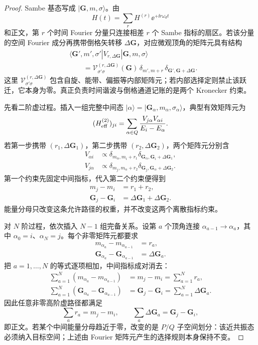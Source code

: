 \begin{proof}
Sambe 基态写成 $|\mathbf G,m,\sigma\rangle$。由
\[
H(t)=\sum_r H^{(r)}\ee^{+\ii r\omega_d t}
\]
和正文，第 $r$ 个时间 Fourier 分量只连接相差 $r$ 个 Sambe 指标的扇区。若该分量的空间 Fourier 成分再携带倒格矢转移 $\Delta\mathbf G$，对应微观顶角的矩阵元具有结构
\begin{align*}
&\langle \mathbf G',m',\sigma'|
V_{r,\Delta\mathbf G}
|\mathbf G,m,\sigma\rangle\\
&\qquad=
\mathcal V^{(r,\Delta\mathbf G)}_{\sigma'\sigma}(\mathbf G)
\,\delta_{m',m+r}
\,\delta_{\mathbf G',\mathbf G+\Delta\mathbf G}.
\end{align*}
这里 $\mathcal V^{(r,\Delta\mathbf G)}_{\sigma'\sigma}$ 包含自旋、能带、偏振等内部矩阵元；若内部选择定则禁止该跃迁，它本身为零。真正负责时间谐波与倒格通道记账的是两个 Kronecker 约束。

先看二阶虚过程。插入一组完整中间态 $|\alpha\rangle=|\mathbf G_\alpha,m_\alpha,\sigma_\alpha\rangle$，典型有效矩阵元为
\[
( H_{\rm eff}^{(2)} )_{ji}
=\sum_{\alpha\in Q}
\frac{V_{j\alpha}V_{\alpha i}}
{E_i-E_\alpha}.
\]
若第一步携带 $(r_1,\Delta\mathbf G_1)$，第二步携带 $(r_2,\Delta\mathbf G_2)$，两个矩阵元分别含
\begin{align*}
V_{\alpha i}&\propto
\delta_{m_\alpha,m_i+r_1}
\delta_{\mathbf G_\alpha,\mathbf G_i+\Delta\mathbf G_1},\\
V_{j\alpha}&\propto
\delta_{m_j,m_\alpha+r_2}
\delta_{\mathbf G_j,\mathbf G_\alpha+\Delta\mathbf G_2}.
\end{align*}
第一个约束先固定中间指标，代入第二个约束便得到
\begin{align*}
m_j-m_i&=r_1+r_2,\\
\mathbf G_j-\mathbf G_i
&=\Delta\mathbf G_1+\Delta\mathbf G_2.
\end{align*}
能量分母只改变这条允许路径的权重，并不改变这两个离散指标约束。

对 $N$ 阶过程，依次插入 $N-1$ 组完备关系。设第 $a$ 个顶角连接 $\alpha_{a-1}\to\alpha_a$，其中 $\alpha_0=i$、$\alpha_N=j$。每个非零矩阵元都要求
\begin{align*}
m_{\alpha_a}-m_{\alpha_{a-1}}&=r_a,\\
\mathbf G_{\alpha_a}-\mathbf G_{\alpha_{a-1}}
&=\Delta\mathbf G_a.
\end{align*}
把 $a=1,\ldots,N$ 的等式逐项相加，中间指标成对消去：
\begin{align*}
\sum_{a=1}^{N}
(m_{\alpha_a}-m_{\alpha_{a-1}})
&=m_j-m_i
=\sum_{a=1}^{N}r_a,\\
\sum_{a=1}^{N}
(\mathbf G_{\alpha_a}-\mathbf G_{\alpha_{a-1}})
&=\mathbf G_j-\mathbf G_i
=\sum_{a=1}^{N}\Delta\mathbf G_a.
\end{align*}
因此任意非零高阶虚路径都满足
\[
\boxed{
\sum_a r_a=m_j-m_i,
\qquad
\sum_a\Delta\mathbf G_a=\mathbf G_j-\mathbf G_i,}
\]
即正文。若某个中间能量分母趋近于零，改变的是 $P/Q$ 子空间划分：该近共振态必须纳入目标空间；上述由 Fourier 矩阵元产生的选择规则本身保持不变。
\end{proof}



